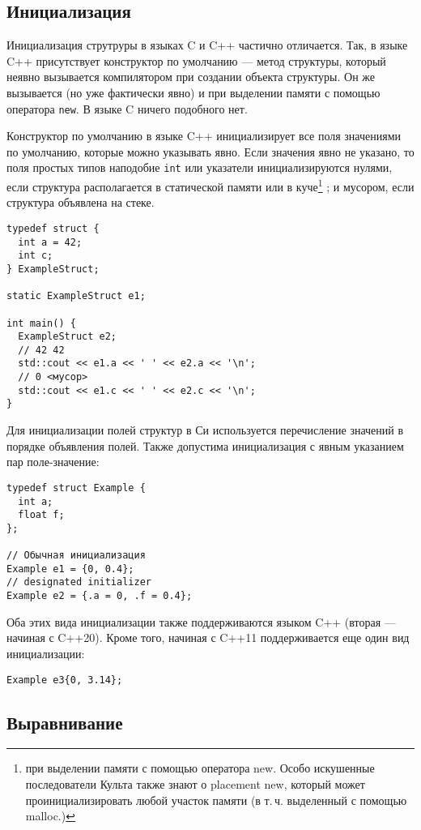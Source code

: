 \subsection*{Инициализация}

Инициализация струтруры в языках C и C++ частично отличается. Так, в языке C++
присутствует конструктор по умолчанию --- метод структуры, который неявно
вызывается компилятором при создании объекта структуры. Он же вызывается (но
уже фактически явно) и при выделении памяти с помощью оператора \verb|new|.
В языке C ничего подобного нет.

Конструктор по умолчанию в языке C++ инициализирует все поля значениями по
умолчанию, которые можно указывать явно. Если значения явно не указано, то
поля простых типов наподобие \verb|int| или указатели инициализируются нулями,
если структура располагается в статической памяти или в куче\footnote{при
выделении памяти с помощью оператора new. Особо искушенные последователи Культа
также знают о placement new, который может проинициализировать любой участок памяти (в
т.\,ч. выделенный с помощью malloc.)}
; и мусором, если
структура объявлена на стеке.
\begin{verbatim}
typedef struct {
  int a = 42;
  int c;
} ExampleStruct;

static ExampleStruct e1;

int main() {
  ExampleStruct e2;
  // 42 42
  std::cout << e1.a << ' ' << e2.a << '\n';
  // 0 <мусор>
  std::cout << e1.c << ' ' << e2.c << '\n';
}
\end{verbatim}

Для инициализации полей структур в Си используется перечисление значений
в порядке объявления полей. Также допустима инициализация с явным указанием
пар поле-значение:
\begin{verbatim}
typedef struct Example {
  int a;
  float f;
};

// Обычная инициализация
Example e1 = {0, 0.4};
// designated initializer
Example e2 = {.a = 0, .f = 0.4};
\end{verbatim}

Оба этих вида инициализации также поддерживаются языком C++ (вторая --- начиная с C++20).
Кроме того, начиная с C++11 поддерживается еще один вид инициализации:
\begin{verbatim}
Example e3{0, 3.14};
\end{verbatim}

\subsection*{Выравнивание}

